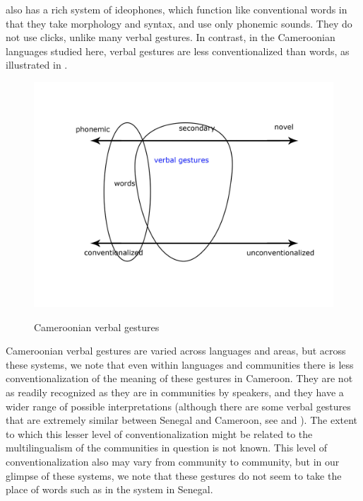 \documentclass[output=paper
,newtxmath
,modfonts
,nonflat]{langsci/langscibook}
\begin{document}
 also has a rich system of ideophones, which function like conventional words in that they take morphology and syntax, and use only phonemic sounds.  They do not use  clicks, unlike many  verbal gestures. In contrast, in the Cameroonian languages studied here, verbal gestures are less conventionalized than words, as illustrated in .


\begin{figure} 
\includegraphics[scale=0.15]{figures/cameroonsystem.jpg}\\
\caption{Cameroonian verbal gestures}
\label{fig:pillion:cam}
\end{figure}

Cameroonian verbal gestures are varied across languages and areas, but across these systems, we note that even within languages and communities there is less conventionalization of the meaning of these gestures in Cameroon. They are not as readily recognized as they are in  communities by speakers, and they have a wider range of possible interpretations (although there are some verbal gestures that are extremely similar between Senegal and Cameroon, see  and ). The extent to which this lesser level of conventionalization might be related to the multilingualism of the communities in question is not known. This level of conventionalization also may vary from community to community, but in our glimpse of these systems, we note that these gestures do not seem to take the place of words such as in the system in Senegal. 
\end{document}
